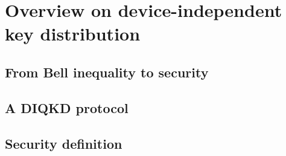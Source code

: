 \chapter{Overview on device-independent key distribution}

\section{From Bell inequality to security}

\section{A DIQKD protocol}

\section{Security definition}

